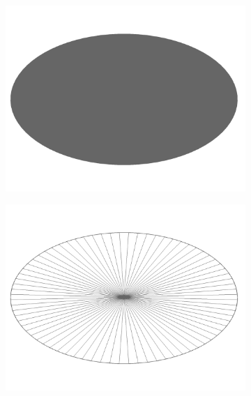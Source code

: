 \begin{figure}
\begin{center}
\begin{subfigure}{0.4\textwidth}
    \includegraphics[width=\linewidth]{assets/images/shapes/bugnew/no_height}
    \caption{}
    \end{subfigure}
    \begin{subfigure}{0.4\textwidth}
    \includegraphics[width=\linewidth]{assets/images/shapes/bugnew/no_height_w}
    \caption{}
    \end{subfigure}
  \end{center}
  \caption{}
  \label{fig:no_height_bug_old}
\end{figure}

